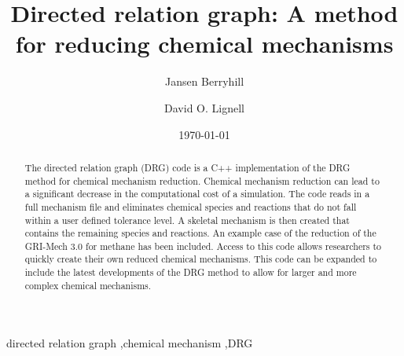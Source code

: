 \documentclass[review,3p]{elsarticle}
\begin{document}


\title{Directed relation graph: A method for reducing chemical mechanisms} 

\author[byu]{Jansen Berryhill}
\author[byu]{David O. Lignell}

\address[byu]{350 CB, Brigham Young University, Provo, UT 84602, USA}


\date{\today}



\begin{abstract}
The directed relation graph (DRG) code is a C++ implementation of the DRG method for chemical mechanism reduction. Chemical mechanism reduction can lead to a significant decrease in the computational cost of a simulation. The code reads in a full mechanism file and eliminates chemical species and reactions that do not fall within a user defined tolerance level. A skeletal mechanism is then created that contains the remaining species and reactions. An example case of the reduction of the GRI-Mech 3.0 for methane has been included. Access to this code allows researchers to quickly create their own reduced chemical mechanisms. This code can be expanded to include the latest developments of the DRG method to allow for larger and more complex chemical mechanisms.  %

\end{abstract}

\begin{keyword} 
directed relation graph \sep chemical mechanism \sep DRG
\end{keyword}


\maketitle     

\end{document}
